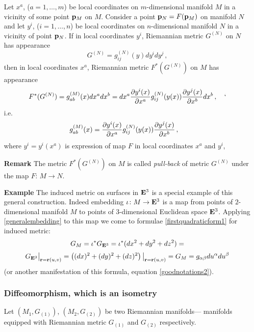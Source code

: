 \documentclass[12pt]{article}
\theoremstyle{theorem}
\numberwithin{equation}{section}
\begin{document}
Let  $x^a$, ($a=1,\dots,m$) be local coordinates on 
$m$-dimensional  manifold
$M$  in a vicinity of some point
${\bf p}_M$ on $M$. Consider a point ${\bf p}_N=F({\bf p}_M)$
on manifold $N$  and let $y^i$,
($i=1,\dots,n$)  
be local coordinates on $n$-dimensional manifold $N$
in a vicinity of point  ${\bf p}_N$.
If in local coordinates $y^i$,
 Riemannian metric $G^{(N)}$ on $N$ has appearance 
       $$G^{(N)}
       =g^{(N)}_{ij}(y)dy^idy^j\,,
       $$
then in local coordinates $x^a$,
Riemannian metric $F^*(G^{(N)})$ on $M$ has appearance 
           \begin{equation*}
            F^*(G^{(N)})=
g^{(M)}_{ab}(x)dx^adx^b=
     dx^a{\partial y^i(x)\over \partial x^a}
       g^{(N)}_{ij}(y(x)) 
     {\partial y^j(x)\over \partial x^b}dx^b\,,\quad`
          \end{equation*}
i.e.      \begin{equation}\label{generalembedding}
g^{(M)}_{ab}(x)=
     {\partial y^i(x)\over \partial x^a}
       g^{(N)}_{ij}(y(x)) 
     {\partial y^j(x)\over \partial x^b}\,,\quad
          \end{equation}
where $y^i=y^i(x^a)$ is expression of map $F$ in local 
coordinates  $x^a$ and $y^i$,       

{\bf Remark}  The metric $F^*(G^{(N)})$ on $M$
is called {\it pull-back} of metric $G^{(N)}$
under the map $F\colon\, M\to N$.

\medskip
 
{\bf Example}  The induced metric
on surfaces in ${\bf E}^3$ is a special example of this
general construction. Indeed embedding
   $\iota\colon M\to {\bf E}^3$ is a map from points
of $2$-dimensional 
manifold $M$ to points of $3$-dimensional 
Euclidean space ${\bf E}^3$.  Applying
\eqref{generalembedding} to this map we come
to formulae  \eqref{firstquadraticform1}  
for induced metric: 
              $$
   G_M= \iota^*G_{{\bf E}^3}=\iota^*(dx^2+dy^2+dz^2)=
              $$
            \begin{equation*}
      G_{{\bf E}^3}\big\vert_{{\bf r}={\bf r}(u,v)}=\left((dx)^2+(dy)^2+(dz)^2\right)\big\vert_{{\bf r}={\bf r}(u,v)}=
        G_M=g_{\alpha\beta}du^\alpha du^\beta
                 \end{equation*}
(or another manifestation of this formula, equation
  \eqref{goodnotations2}).


\subsubsection {Diffeomorphism, which is an isometry}

  Let $(M_1,G_{(1)})$, $(M_2,G_{(2)})$ be 
two Riemannian manifolds---
 manifolds equipped
with Riemannian metric $G_{(1)}$ and $G_{(2)}$ respectively.
\end{document}
